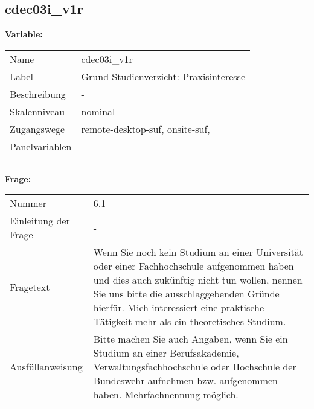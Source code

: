 	
	
	\subsection{cdec03i\_v1r}
	\label{subSection:cdec03i_v1r}

	\noindent\textbf{Variable:}\\
		\begin{tabular}{lL{11.3cm}}
			\label{tableVariable:cdec03i_v1r}
			Name & cdec03i\_v1r \\
			Label & Grund Studienverzicht: Praxisinteresse \\
			Beschreibung & - \\
			Skalenniveau & nominal \\
			Zugangswege &
				remote-desktop-suf,
				onsite-suf,
 \\
			Panelvariablen & -
			 \\
			 \\
 \\
		\end{tabular}

		\vspace*{1 cm}
		\noindent\textbf{Frage:}\\
		\begin{tabular}{lL{11.3cm}}
			\label{tableQuestion:cdec03i_v1r}
			Nummer & 6.1 \\
			Einleitung der Frage & - \\
			Fragetext & Wenn Sie noch kein Studium an einer Universität oder einer Fachhochschule aufgenommen haben und dies auch zukünftig nicht tun wollen, nennen Sie uns bitte die ausschlaggebenden Gründe hierfür.
Mich interessiert eine praktische Tätigkeit mehr als ein theoretisches Studium. \\
			Ausfüllanweisung & Bitte machen Sie auch Angaben, wenn Sie ein Studium an einer Berufsakademie, Verwaltungsfachhochschule oder Hochschule der Bundeswehr aufnehmen bzw. aufgenommen haben. Mehrfachnennung möglich. \\
		\end{tabular}





